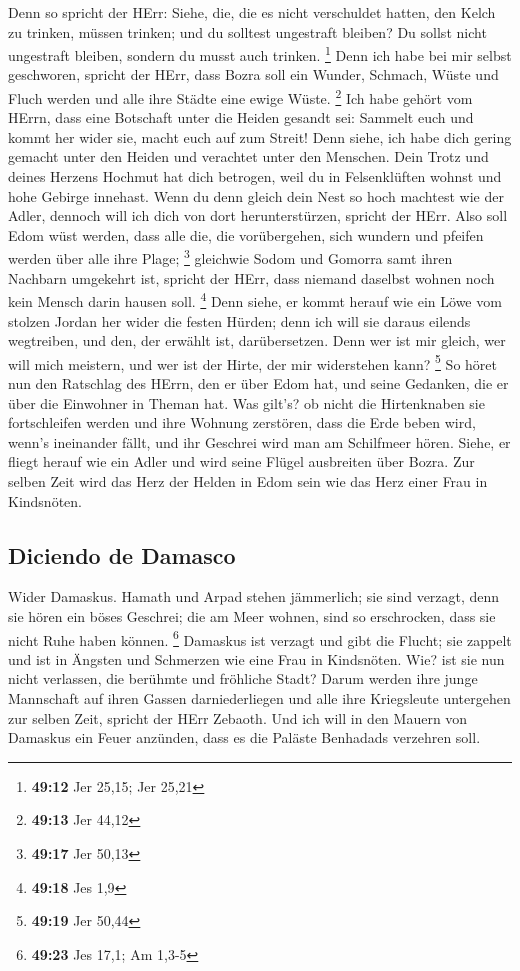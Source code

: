  Denn so spricht der HErr: Siehe, die, die es nicht
verschuldet hatten, den Kelch zu trinken, müssen trinken; und du
solltest ungestraft bleiben? Du sollst nicht ungestraft bleiben, sondern
du musst auch trinken. \footnote{\textbf{49:12} Jer 25,15; Jer 25,21}
 Denn ich habe bei mir selbst geschworen, spricht der
HErr, dass Bozra soll ein Wunder, Schmach, Wüste und Fluch werden und
alle ihre Städte eine ewige Wüste. \footnote{\textbf{49:13} Jer 44,12}
 Ich habe gehört vom HErrn, dass eine Botschaft unter die
Heiden gesandt sei: Sammelt euch und kommt her wider sie, macht euch auf
zum Streit!  Denn siehe, ich habe dich gering gemacht
unter den Heiden und verachtet unter den Menschen.  Dein
Trotz und deines Herzens Hochmut hat dich betrogen, weil du in
Felsenklüften wohnst und hohe Gebirge innehast. Wenn du denn gleich dein
Nest so hoch machtest wie der Adler, dennoch will ich dich von dort
herunterstürzen, spricht der HErr.  Also soll Edom wüst
werden, dass alle die, die vorübergehen, sich wundern und pfeifen werden
über alle ihre Plage; \footnote{\textbf{49:17} Jer 50,13}
 gleichwie Sodom und Gomorra samt ihren Nachbarn
umgekehrt ist, spricht der HErr, dass niemand daselbst wohnen noch kein
Mensch darin hausen soll. \footnote{\textbf{49:18} Jes 1,9}
 Denn siehe, er kommt herauf wie ein Löwe vom stolzen
Jordan her wider die festen Hürden; denn ich will sie daraus eilends
wegtreiben, und den, der erwählt ist, darübersetzen. Denn wer ist mir
gleich, wer will mich meistern, und wer ist der Hirte, der mir
widerstehen kann? \footnote{\textbf{49:19} Jer 50,44}  So
höret nun den Ratschlag des HErrn, den er über Edom hat, und seine
Gedanken, die er über die Einwohner in Theman hat. Was gilt's? ob nicht
die Hirtenknaben sie fortschleifen werden und ihre Wohnung zerstören,
 dass die Erde beben wird, wenn's ineinander fällt, und
ihr Geschrei wird man am Schilfmeer hören.  Siehe, er
fliegt herauf wie ein Adler und wird seine Flügel ausbreiten über Bozra.
Zur selben Zeit wird das Herz der Helden in Edom sein wie das Herz einer
Frau in Kindsnöten.

\hypertarget{diciendo-de-damasco}{%
\subsection{Diciendo de Damasco}\label{diciendo-de-damasco}}

 Wider Damaskus. Hamath und Arpad stehen jämmerlich; sie
sind verzagt, denn sie hören ein böses Geschrei; die am Meer wohnen,
sind so erschrocken, dass sie nicht Ruhe haben können. \footnote{\textbf{49:23}
  Jes 17,1; Am 1,3-5}  Damaskus ist verzagt und gibt die
Flucht; sie zappelt und ist in Ängsten und Schmerzen wie eine Frau in
Kindsnöten.  Wie? ist sie nun nicht verlassen, die
berühmte und fröhliche Stadt?  Darum werden ihre junge
Mannschaft auf ihren Gassen darniederliegen und alle ihre Kriegsleute
untergehen zur selben Zeit, spricht der HErr Zebaoth. 
Und ich will in den Mauern von Damaskus ein Feuer anzünden, dass es die
Paläste Benhadads verzehren soll.


